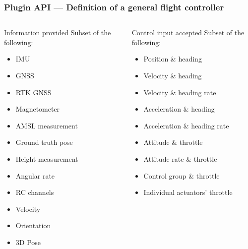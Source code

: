 \documentclass[aspectratio=169]{beamer}
\begin{document}
\begin{frame}
  \frametitle{Plugin API --- Definition of a general flight controller}

  \begin{columns}[c]

    \begin{block}{Information provided}
      Subset of the following:
      \begin{itemize}
        \item IMU
        \item GNSS
        \item RTK GNSS
        \item Magnetometer
        \item AMSL measurement
        \item Ground truth pose
        \item Height measurement
        \item Angular rate
        \item RC channels
        \item Velocity
        \item Orientation
        \item 3D Pose
      \end{itemize}
    \end{block}

    \begin{block}{Control input accepted}
      Subset of the following:
      \begin{itemize}
        \item Position \& heading
        \item Velocity \& heading
        \item Velocity \& heading rate
        \item Acceleration \& heading
        \item Acceleration \& heading rate
        \item Attitude \& throttle
        \item Attitude rate \& throttle
        \item Control group \& throttle
        \item Individual actuators' throttle
      \end{itemize}
    \end{block}

  \end{columns}

\end{frame}
\end{document}
